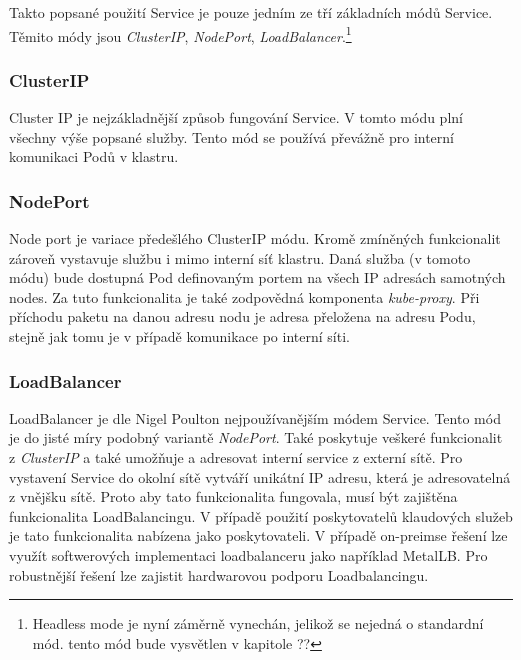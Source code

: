 Takto popsané použití Service je pouze jedním ze tří základních módů Service. Těmito módy jsou \textit{ClusterIP}, \textit{NodePort}, \textit{LoadBalancer}.\footnote{Headless mode je nyní záměrně vynechán, jelikož se nejedná o standardní mód. tento mód bude vysvětlen v kapitole ??} 

\subsubsection{ClusterIP}
Cluster IP je nejzákladnější způsob fungování Service. V tomto módu plní všechny výše popsané služby. Tento mód se používá převážně pro interní komunikaci Podů v klastru. 
\subsubsection{NodePort}
Node port je variace předešlého ClusterIP módu. Kromě zmíněných funkcionalit zároveň vystavuje službu i mimo interní síť klastru. Daná služba (v tomoto módu) bude dostupná Pod definovaným portem na všech IP adresách samotných nodes. Za tuto funkcionalita je také zodpovědná komponenta \textit{kube-proxy}. Při příchodu paketu na danou adresu nodu je adresa přeložena na adresu Podu, stejně jak tomu je v případě komunikace po interní síti.   
\subsubsection{LoadBalancer}
LoadBalancer je dle Nigel Poulton\cite{poulton_2022_the} nejpoužívanějším módem Service. Tento mód je do jisté míry podobný variantě \textit{NodePort}. Také poskytuje veškeré funkcionalit z \textit{ClusterIP} a také umožňuje a adresovat interní service z externí sítě. Pro vystavení Service do okolní sítě vytváří unikátní IP adresu, která je adresovatelná z vnějšku sítě. Proto aby tato funkcionalita fungovala, musí být zajištěna funkcionalita LoadBalancingu. V případě použití poskytovatelů klaudových služeb je tato funkcionalita nabízena jako poskytovateli. V případě on-preimse řešení lze využít softwerových implementaci loadbalanceru jako například MetalLB. Pro robustnější řešení lze zajistit hardwarovou podporu Loadbalancingu. 


